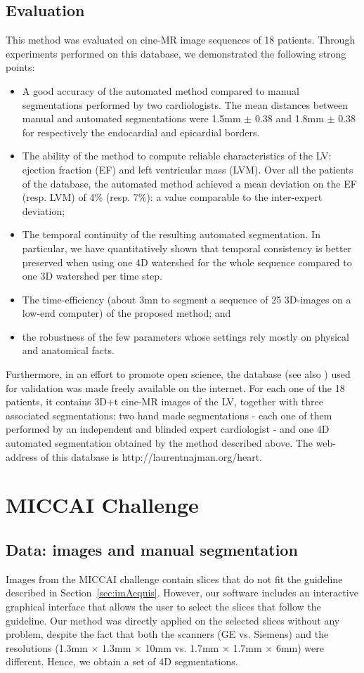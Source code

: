 \documentclass{llncs}
\begin{document}
\subsection{Evaluation}
This method was evaluated on cine-MR image sequences of 18
patients. Through experiments performed on this database, we demonstrated
the following strong points:
\begin{itemize}
\item A good accuracy of the automated method compared to manual
  segmentations performed by two cardiologists. The mean distances
  between manual and automated segmentations were 1.5mm $\pm$
  0.38 and 1.8mm $\pm$ 0.38 for respectively the endocardial and
  epicardial borders.
\item The ability of the method to compute reliable characteristics of
  the LV: ejection fraction (EF) and left ventricular mass (LVM). Over
  all the patients of the database, the automated method achieved a
  mean deviation on the EF (resp. LVM) of 4\% (resp. 7\%): a value
  comparable to the inter-expert deviation;
\item The temporal continuity of the resulting automated
  segmentation. In particular, we have quantitatively shown that
  temporal consistency is better preserved when using one 4D watershed
  for the whole sequence compared to one 3D watershed per time step.
\item The time-efficiency (about 3mn to segment a sequence of 25
  3D-images on a low-end computer) of the proposed method; and
\item the robustness of the few parameters whose settings rely mostly
  on physical and anatomical facts.
\end{itemize}
Furthermore, in an effort to promote open science, the database (see
also \cite{NC-et-al-MICCAI2007}) used for validation was made freely
available on the internet. For each one of the 18 patients, it
contains 3D+t cine-MR images of the LV, together with three associated
segmentations: two hand made segmentations - each one of them
performed by an independent and blinded expert cardiologist - and one
4D automated segmentation obtained by the method described above. The
web-address of this database is http://laurentnajman.org/heart.

\section{MICCAI Challenge}
\label{sec:MICCAIChallenge}
%
\subsection{Data: images and manual segmentation}
\label{sec:DataImagesManualSegmentation}
Images from the MICCAI challenge contain slices that do not fit the
guideline described in Section~\ref{sec:imAcquis}. However, our
software includes an interactive graphical interface that allows the
user to select the slices that follow the guideline. Our method was 
directly applied on the selected slices without any
problem, despite the fact that both the scanners (GE vs. Siemens) and
the resolutions (1.3mm $\times$ 1.3mm $\times$ 10mm vs. 1.7mm $\times$
1.7mm $\times$ 6mm) were different. Hence, we obtain a set of 4D
segmentations.
\end{document}
